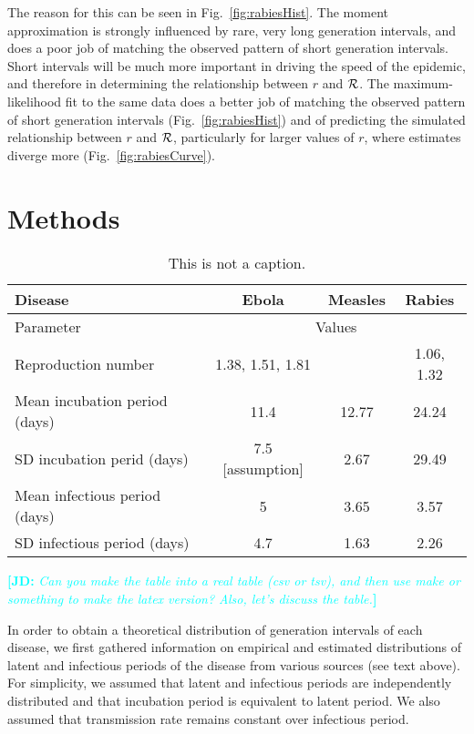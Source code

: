 \documentclass[12pt,]{article}
\newcommand{\RR}{\ensuremath{{\cal R}}}
\newcommand{\fref}[1]{Fig.~\ref{fig:#1}}
\newcommand{\tlab}[1]{\label{tab:#1}}
\newcommand{\comment}[3]{\textcolor{#1}{\textbf{[#2: }\textit{#3}\textbf{]}}}
\newcommand{\jd}[1]{\comment{cyan}{JD}{#1}}
\begin{document}
The reason for this can be seen in \fref{rabiesHist}. The moment approximation is strongly influenced by rare, very long generation intervals, and does a poor job of matching the observed pattern of short generation intervals. Short intervals will be much more important in driving the speed of the epidemic, and therefore in determining the relationship between $r$ and \RR. The maximum-likelihood fit to the same data does a better job of matching the observed pattern of short generation intervals (\fref{rabiesHist}) and of predicting the simulated relationship between $r$ and \RR, particularly for larger values of $r$, where estimates diverge more (\fref{rabiesCurve}).

\section{Methods}

\begin{table}[h!]
\centering
\begin{tabular}{l*{3}{c}}
\hline
Disease & Ebola & Measles & Rabies\\
\hline
Parameter & \multicolumn{3}{c}{Values}\\
\hline
Reproduction number & 1.38, 1.51, 1.81 \cite{WHO14} & & 1.06, 1.32 \cite{HampDush09} \\
Mean incubation period (days) & 11.4 \cite{WHO14} & 12.77 \cite{LessReic09inc}  & 24.24 \cite{HampDush09} \\
SD incubation perid (days) & 7.5 [assumption] & 2.67 \cite{LessReic09inc} & 29.49 \cite{HampDush09} \\
Mean infectious period (days) & 5 \cite{WHO14} & 3.65 \cite{Lloy01} & 3.57 \cite{HampDush09} \\
SD infectious period (days) & 4.7 \cite{WHO14} & 1.63 \cite{Lloy01} & 2.26 \cite{HampDush09}
\end{tabular}
\caption{This is not a caption.}
\tlab{parameters}
\end{table}

\jd{Can you make the table into a real table (csv or tsv), and then use make or something to make the latex version? Also, let's discuss the table.}

In order to obtain a theoretical distribution of generation intervals of each disease, we first gathered information on empirical and estimated distributions of latent and infectious periods of the disease from various sources (see text above). For simplicity, we assumed that latent and infectious periods are independently distributed and that incubation period is equivalent to latent period. We also assumed that transmission rate remains constant over infectious period.
\end{document}

